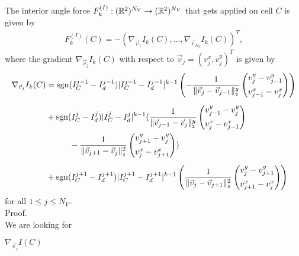 \begin{proposition}
	The interior angle force $F_{k}^{(I)}: (\mathbb{R}^2)^{N_V} \rightarrow (\mathbb{R}^2)^{N_V}$ that gets applied on cell $C$ is given by  
	\begin{align*}
		F_{k}^{(I)}(C) 
		= - (\nabla_{\vec{v}_1} I_k(C), \ldots, \nabla_{\vec{v}_{N_V}} I_k(C))^T,
	\end{align*}
	where the gradient $\nabla_{\vec{v}_j} I_k(C)$ with respect to $\vec{v}_j = (v_{j}^{x}, v_{j}^{y})^T$ is given by 
	\begin{align}
		\begin{split}
			\nabla_{\vec{v}_j} I_k(C) &= \sgn(I^{j-1}_{C} - I^{j-1}_d) |I^{j-1}_{C} - I^{j-1}_d|^{k-1} \left( 
					- \frac{1}{\norm[\vec{v}_{j} - \vec{v}_{j-1}]^{y}} \begin{pmatrix}
						v_{j}^{y} - v_{j-1}^{y} \\[0.5em]
						v_{j-1}^{x} - v_{j}^{x}
					\end{pmatrix} 
				\right) \\[0.5em] 
			&+ \sgn(I^{j}_{C} - I^{j}_d)|I^{j}_{C} - I^{j}_d|^{k-1} ( 
				\frac{1}{\norm[\vec{v}_{j-1} - \vec{v}_j]^{y}} \begin{pmatrix}
				v_{j-1}^{y} - v_{j}^{y} \\[0.5em]
				v_{j}^{x} - v_{j-1}^{x}
				\end{pmatrix} \\
			&\hspace{1cm} - \frac{1}{\norm[\vec{v}_{j+1} - \vec{v}_j]^2} \begin{pmatrix}
				v_{j+1}^{y} - v_{j}^{y} \\[0.5em]
				v_{j}^{x} - v_{j+1}^{x}
				\end{pmatrix} 
				) \\[0.5em] 
			&+ \sgn(I^{j+1}_{C} - I^{j+1}_d) |I^{j+1}_{C} - I^{j+1}_d|^{k-1} \left( 
				\frac{1}{\norm[\vec{v}_{j} - \vec{v}_{j+1}]^2} \begin{pmatrix}
				v_{j}^{y} - v_{j+1}^{y} \\[0.5em]
				v_{j+1}^{x} - v_{j}^{x}
				\end{pmatrix} 
				\right) %
		\end{split}
		\label{gradient:angle}
	\end{align}
	for all $1 \leq j \leq N_V$.\\

	Proof. \\
	We are looking for 
	\begin{center}
		$
		\nabla_{\vec{v}_j} I(C)
		$
	\end{center}
	

\end{proposition}
